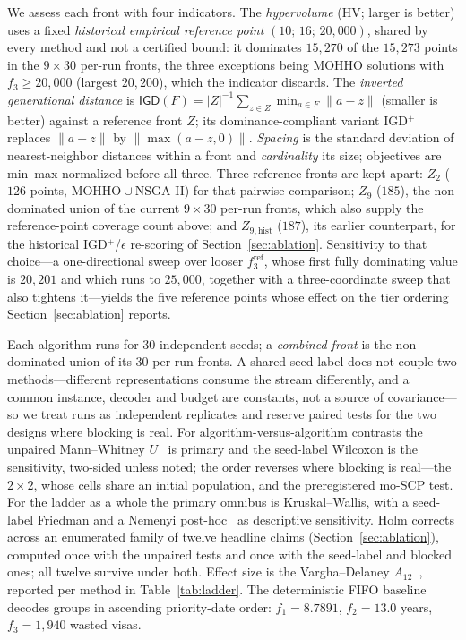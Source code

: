 \documentclass[runningheads]{llncs}
\newcommand{\HV}{\textsf{HV}}
\newcommand{\IGD}{\textsf{IGD}}
\begin{document}
We assess each front with four indicators. The \emph{hypervolume} (\HV; larger is better) uses a fixed \emph{historical empirical reference point} $(10;\,16;\,20{,}000)$, shared by every method and not a certified bound: it dominates $15{,}270$ of the $15{,}273$ points in the $9\times30$ per-run fronts, the three exceptions being MOHHO solutions with $f_3\ge 20{,}000$ (largest $20{,}200$), which the indicator discards. The \emph{inverted generational distance} is $\IGD(F)=|Z|^{-1}\sum_{z\in Z}\min_{a\in F}\lVert a-z\rVert$ (smaller is better) against a reference front $Z$; its dominance-compliant variant \IGD$^{+}$ replaces $\lVert a-z\rVert$ by $\lVert\max(a-z,0)\rVert$. \emph{Spacing} is the standard deviation of nearest-neighbor distances within a front and \emph{cardinality} its size; objectives are min--max normalized before all three. Three reference fronts are kept apart: $Z_2$ ($126$ points, MOHHO${}\cup{}$NSGA-II) for that pairwise comparison; $Z_9$ ($185$), the non-dominated union of the current $9\times30$ per-run fronts, which also supply the reference-point coverage count above; and $Z_{9,\text{hist}}$ ($187$), its earlier counterpart, for the historical \IGD$^{+}$/$\epsilon$ re-scoring of Section~\ref{sec:ablation}. Sensitivity to that choice---a one-directional sweep over looser $f_3^{\text{ref}}$, whose first fully dominating value is $20{,}201$ and which runs to $25{,}000$, together with a three-coordinate sweep that also tightens it---yields the five reference points whose effect on the tier ordering Section~\ref{sec:ablation} reports.

Each algorithm runs for 30 independent seeds; a \emph{combined front} is the non-dominated union of its 30 per-run fronts. A shared seed label does not couple two methods---different representations consume the stream differently, and a common instance, decoder and budget are constants, not a source of covariance---so we treat runs as independent replicates and reserve paired tests for the two designs where blocking is real. For algorithm-versus-algorithm contrasts the unpaired Mann--Whitney $U$~\cite{derrac} is primary and the seed-label Wilcoxon is the sensitivity, two-sided unless noted; the order reverses where blocking is real---the $2\times2$, whose cells share an initial population, and the preregistered mo-SCP test. For the ladder as a whole the primary omnibus is Kruskal--Wallis, with a seed-label Friedman and a Nemenyi post-hoc~\cite{demsar} as descriptive sensitivity. Holm corrects across an enumerated family of twelve headline claims (Section~\ref{sec:ablation}), computed once with the unpaired tests and once with the seed-label and blocked ones; all twelve survive under both. Effect size is the Vargha--Delaney $A_{12}$~\cite{vargha}, reported per method in Table~\ref{tab:ladder}. The deterministic FIFO baseline decodes groups in ascending priority-date order: $f_1=8.7891$, $f_2=13.0$ years, $f_3=1{,}940$ wasted visas.
\end{document}
